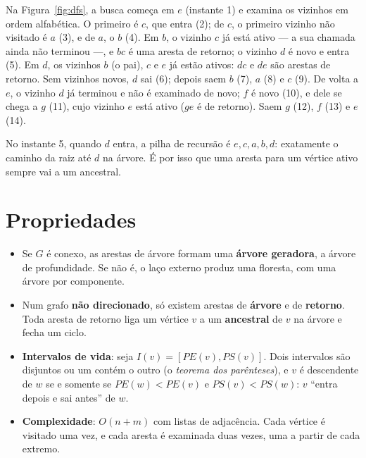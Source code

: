 \begin{exemplo}\label{ex:dfs}
Na Figura~\ref{fig:dfs}, a busca começa em $e$ (instante 1) e examina os vizinhos em ordem alfabética. O primeiro é $c$, que entra (2); de $c$, o primeiro vizinho não visitado é $a$ (3), e de $a$, o $b$ (4). Em $b$, o vizinho $c$ já está ativo --- a sua chamada ainda não terminou ---, e $bc$ é uma aresta de retorno; o vizinho $d$ é novo e entra (5). Em $d$, os vizinhos $b$ (o pai), $c$ e $e$ já estão ativos: $dc$ e $de$ são arestas de retorno. Sem vizinhos novos, $d$ sai (6); depois saem $b$ (7), $a$ (8) e $c$ (9). De volta a $e$, o vizinho $d$ já terminou e não é examinado de novo; $f$ é novo (10), e dele se chega a $g$ (11), cujo vizinho $e$ está ativo ($ge$ é de retorno). Saem $g$ (12), $f$ (13) e $e$ (14).

No instante 5, quando $d$ entra, a pilha de recursão é $e,c,a,b,d$: exatamente o caminho da raiz até $d$ na árvore. É por isso que uma aresta para um vértice ativo sempre vai a um ancestral.
\end{exemplo}

\section{Propriedades}\label{sec:dfsprop}
\begin{itemize}
  \item Se $G$ é conexo, as arestas de árvore formam uma \textbf{árvore geradora}, a árvore de profundidade. Se não é, o laço externo produz uma floresta, com uma árvore por componente.
  \item Num grafo \textbf{não direcionado}, só existem arestas de \textbf{árvore} e de \textbf{retorno}. Toda aresta de retorno liga um vértice $v$ a um \textbf{ancestral} de $v$ na árvore e fecha um ciclo.
  \item \textbf{Intervalos de vida}: seja $I(v)=[PE(v),PS(v)]$. Dois intervalos são disjuntos ou um contém o outro (o \emph{teorema dos parênteses}), e $v$ é descendente de $w$ se e somente se $PE(w)<PE(v)$ e $PS(v)<PS(w)$: $v$ ``entra depois e sai antes'' de $w$.
  \item \textbf{Complexidade}: $O(n+m)$ com listas de adjacência. Cada vértice é visitado uma vez, e cada aresta é examinada duas vezes, uma a partir de cada extremo.
\end{itemize}

